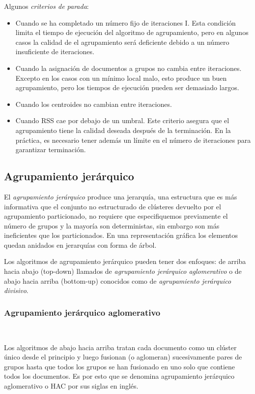 \documentclass{llncs}
\begin{document}
Algunos \textit{criterios de parada}:
\begin{itemize}
	\item Cuando se ha completado un número fijo de iteraciones I. Esta condición limita el tiempo de ejecución del algoritmo de agrupamiento, pero en algunos casos la calidad de el agrupamiento será deficiente debido a un número insuficiente de iteraciones.
	\item Cuando la asignación de documentos a grupos no cambia entre iteraciones. Excepto en los casos con un m\'inimo local malo, esto produce un buen agrupamiento, pero los tiempos de ejecución pueden ser demasiado largos.
	\item Cuando los centroides no cambian entre iteraciones.
	\item Cuando RSS cae por debajo de un umbral. Este criterio asegura que el agrupamiento tiene la calidad deseada después de la terminación. En la práctica, es necesario tener adem\'as un límite en el número de iteraciones para garantizar terminación.
\end{itemize}

\subsection{Agrupamiento jer\'arquico}

El \textit{agrupamiento jerárquico} produce una jerarquía, una estructura que es más informativa que el conjunto no estructurado de clústeres devuelto por el agrupamiento particionado, no requiere que especifiquemos previamente el número de grupos y la mayoría son deterministas, sin embargo son m\'as ineficientes que los particionados. En una representación gráfica los elementos quedan anidados en jerarquías con forma de árbol.

Los algoritmos de agrupamiento jerárquico pueden tener dos enfoques: de arriba hacia abajo (top-down) llamados de \textit{agrupamiento jer\'arquico aglomerativo} o de abajo hacia arriba (bottom-up) conocidos como de \textit{agrupamiento jer\'arquico divisivo}. 

\subsubsection{Agrupamiento jer\'arquico aglomerativo}
\textcolor{white}{.}

\vspace{0.5em}
Los algoritmos de abajo hacia arriba tratan cada documento como un clúster único desde el principio y luego fusionan (o aglomeran) sucesivamente pares de grupos hasta que todos los grupos se han fusionado en uno solo que contiene todos los documentos. 
Es por esto que se denomina agrupamiento jerárquico aglomerativo o HAC por sus siglas en ingl\'es. 
\end{document}
